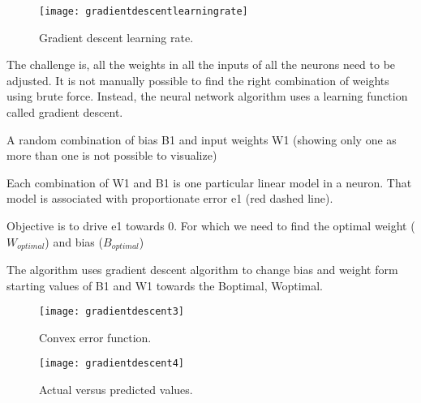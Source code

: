 	\begin{figure}[h]
		\centering
		\texttt{[image: gradientdescentlearningrate]}
		\caption[Gradient descent learning rate]{Gradient descent learning rate.}
		\label{fig:gradientdescentlearningrate}
	\end{figure}

The challenge is, all the weights in all the inputs of all the neurons need to be adjusted. It is not manually possible to find the right combination of weights using brute force. Instead, the neural network algorithm uses a learning function called gradient descent.
	\begin{numberedlist}
		\item A random combination of bias B1 and input weights W1 (showing only one as more than one is not possible to visualize)
		\item Each combination of W1 and B1 is one particular linear model in a neuron. That model is associated with proportionate error e1 (red dashed line).
		\item Objective is to drive e1 towards 0. For which we need to find the optimal weight ($W_{optimal}$) and bias ($B_{optimal}$)
		\item The algorithm uses gradient descent algorithm to change bias and weight form starting values of B1 and W1 towards the Boptimal, Woptimal.
	\end{numberedlist}

 	\begin{figure}[h]
		\centering
		\texttt{[image: gradientdescent3]}
		\caption[Convex error function]{Convex error function.}
		\label{fig:gradientdescent3}
	\end{figure}

 	\begin{figure}[h]
		\centering
		\texttt{[image: gradientdescent4]}
		\caption[Actual versus predicted values]{Actual versus predicted values.}
		\label{fig:gradientdescent4}
	\end{figure}


